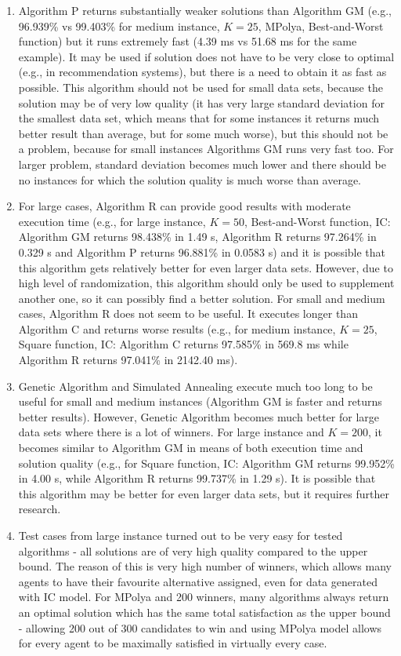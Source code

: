 \begin{enumerate}
	\item Algorithm P returns substantially weaker solutions than Algorithm GM (e.g., 96.939\% vs 99.403\% for medium instance, $K = 25$, MPolya, Best-and-Worst function) but it runs extremely fast (4.39 ms vs 51.68 ms for the same example). It may be used if solution does not have to be very close to optimal (e.g., in recommendation systems), but there is a need to obtain it as fast as possible. This algorithm should not be used for small data sets, because the solution may be of very low quality (it has very large standard deviation for the smallest data set, which means that for some instances it returns much better result than average, but for some much worse), but this should not be a problem, because for small instances Algorithms GM runs very fast too. For larger problem, standard deviation becomes much lower and there should be no instances for which the solution quality is much worse than average.
	\item For large cases, Algorithm R can provide good results with moderate execution time (e.g., for large instance, $K = 50$, Best-and-Worst function, IC: Algorithm GM returns 98.438\% in 1.49 s, Algorithm R returns 97.264\% in 0.329 s and Algorithm P returns 96.881\% in 0.0583 s) and it is possible that this algorithm gets relatively better for even larger data sets. However, due to high level of randomization, this algorithm should only be used to supplement another one, so it can possibly find a better solution. For small and medium cases, Algorithm R does not seem to be useful. It executes longer than Algorithm C and returns worse results (e.g., for medium instance, $K = 25$, Square function, IC: Algorithm C returns 97.585\% in 569.8 ms while Algorithm R returns 97.041\% in 2142.40 ms).
    \item Genetic Algorithm and Simulated Annealing execute much too long to be useful for small and medium instances (Algorithm GM is faster and returns better results). However, Genetic Algorithm becomes much better for large data sets where there is a lot of winners. For large instance and $K = 200$, it becomes similar to Algorithm GM in means of both execution time and solution quality (e.g., for Square function, IC: Algorithm GM returns 99.952\% in 4.00 s, while Algorithm R returns 99.737\% in 1.29 s). It is possible that this algorithm may be better for even larger data sets, but it requires further research.
	\item Test cases from large instance turned out to be very easy for tested algorithms - all solutions are of very high quality compared to the upper bound. The reason of this is very high number of winners, which allows many agents to have their favourite alternative assigned, even for data generated with IC model. For MPolya and 200 winners, many algorithms always return an optimal solution which has the same total satisfaction as the upper bound - allowing 200 out of 300 candidates to win and using MPolya model allows for every agent to be maximally satisfied in virtually every case.
\end{enumerate}

